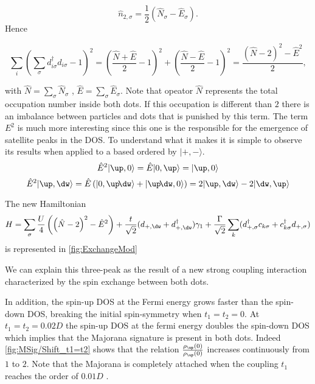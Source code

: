 \[\hat{n}_{2,\sigma}= \frac{1}{2} \left( \hat{N}_\sigma - \hat{E}_\sigma \right).  \]
Hence 

\[\sum_{i} (\sum_{\sigma} d_{i \sigma}^{\dagger}d_{i \sigma}-1)^{2} = \left(\frac{\hat{N} +\hat{E}}{2}-1 \right) ^{2} + \left( \frac{\hat{N} -\hat{E}}{2}-1 \right)^{2} = \frac{\left( \hat{N}-2 \right)^2- \hat{E}^2}{2}, \]

with $\hat{N}=\sum_\sigma \hat{N}_\sigma $ , $\hat{E}=\sum_\sigma \hat{E}_\sigma $. Note that opeator $\hat{N}$ represents the total occupation number inside both dots. If this occupation is different than $2$ there is an imbalance between particles and dots that is punished by this term. The term $E^2$ is much more interesting since this one is the responsible for the emergence of satellite peaks in the DOS. To understand what it makes it is simple to observe its results when applied to a based ordered by $\vert + , - \rangle$. 
\[ \hat{E}^2 \vert \up , 0 \rangle =  \hat{E} \vert 0 , \up \rangle = \vert \up , 0 \rangle   \] 
\[ \hat{E}^2 \vert \up , \dw \rangle =  \hat{E} \left( \vert 0 , \up\!\dw \rangle + \vert \up\!\dw , 0 \rangle \right) = 2\vert \up , \dw \rangle - 2\vert \dw , \up \rangle  \]





The new Hamiltonian 
\begin{equation}
H = \sum_{\sigma}  \frac{U}{4}\left( \left( \hat{N}-2 \right)^2- \hat{E}^2 \right) + \frac{t}{\sqrt{2}} (d_{+,\dw}+d^\dagger_{+,\dw})\gamma_1 
 +  \frac{\Gamma}{\sqrt{2}}\sum_{ k}(d^\dagger_{+,\sigma}c_{k\sigma}+c^\dagger_{k\sigma}d_{+,\sigma})
\label{t+}
\end{equation}
is represented in \ref{fig:ExchangeMod}







We can explain this three-peak as the result of a new strong coupling interaction characterized by the spin exchange between both dots. 

In addition, the spin-up DOS at the Fermi energy grows faster than the spin-down DOS, breaking the initial spin-symmetry when $t_1=t_2=0$. At $t_1=t_2=0.02D$ the spin-up DOS at the fermi energy doubles the spin-down DOS which implies that the Majorana signature  is present in both dots. %
Indeed \ref{fig:MSig/Shift_t1=t2} shows that the relation $\frac{\rho_\up(0)}{\rho_\up(0)}$ increases continuously from $1$ to $2$. Note that the Majorana is completely attached when the coupling $t_1$ reaches the order of $0.01D$ .
